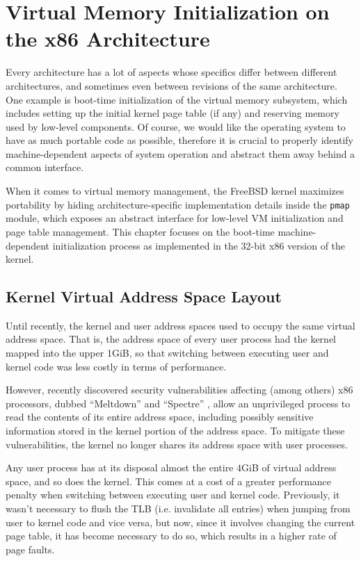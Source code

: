 \documentclass[shortabstract, english]{iithesis}
\begin{document}
\chapter{Virtual Memory Initialization on the x86 Architecture}

Every architecture has a lot of aspects whose specifics differ between different
architectures, and sometimes even between revisions of the same architecture.
One example is boot-time initialization of the virtual memory subsystem, which
includes setting up the initial kernel page table (if any) and reserving memory
used by low-level components. Of course, we would like the operating system to
have as much portable code as possible, therefore it is crucial to properly
identify machine-dependent aspects of system operation and abstract them away
behind a common interface.

When it comes to virtual memory management, the FreeBSD kernel maximizes
portability by hiding architecture-specific implementation details inside the
\texttt{pmap} \cite{freebsd:pmap} module, which exposes an abstract interface
for low-level VM initialization and page table management. This chapter focuses
on the boot-time machine-dependent initialization process as implemented in the
32-bit x86 version of the kernel.

\section{Kernel Virtual Address Space Layout}
\label{section:x86layout}

Until recently, the kernel and user address spaces used to occupy the same
virtual address space. That is, the address space of every user process had the
kernel mapped into the upper 1GiB, so that switching between executing user and
kernel code was less costly in terms of performance.

However, recently discovered security vulnerabilities affecting (among others)
x86 processors, dubbed ``Meltdown'' \cite{bib:meltdown} and ``Spectre''
\cite{bib:spectre}, allow an unprivileged process to read the contents of its
entire address space, including possibly sensitive information stored in the
kernel portion of the address space. To mitigate these vulnerabilities, the
kernel no longer shares its address space with user processes.

Any user process has at its disposal almost the entire 4GiB of virtual address
space, and so does the kernel. This comes at a cost of a greater performance
penalty when switching between executing user and kernel code. Previously, it
wasn't necessary to flush the TLB (i.e. invalidate all entries) when jumping
from user to kernel code and vice versa, but now, since it involves changing the
current page table, it has become necessary to do so, which results in a higher
rate of page faults.
\end{document}

